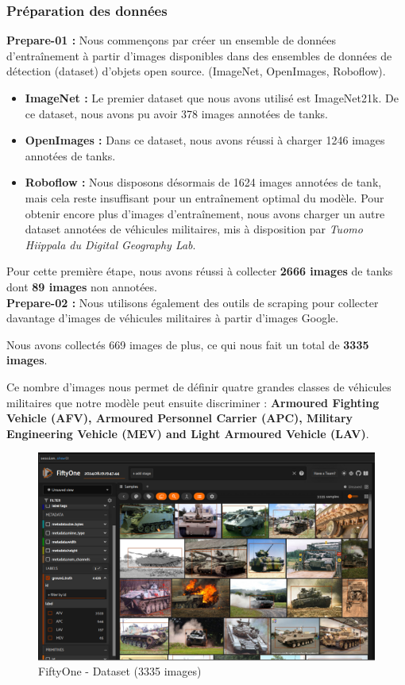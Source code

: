 \subsubsection{Préparation des données}

\indent \textbf{Prepare-01 :} Nous commençons par créer un ensemble de données d'entraînement à partir d'images disponibles dans des ensembles de données de détection (dataset) d'objets open source. (ImageNet, OpenImages, Roboflow).

\begin{itemize}
	\item \textbf{ImageNet : }Le premier dataset que nous avons utilisé est ImageNet21k. De ce dataset, nous avons pu avoir 378 images annotées de tanks.
	\item \textbf{OpenImages : } Dans ce dataset, nous avons réussi à charger 1246 images annotées de tanks.
	\item \textbf{Roboflow : } Nous disposons désormais de 1624 images annotées de tank, mais cela reste insuffisant pour un entraînement optimal du modèle. Pour obtenir encore plus d'images d'entraînement, nous avons charger un autre dataset annotées de véhicules militaires, mis à disposition par \textit{Tuomo Hiippala du Digital Geography Lab}.
\end{itemize}

\noindent Pour cette première étape, nous avons réussi à collecter \textbf{2666 images} de tanks dont \textbf{89 images} non annotées.\\


\noindent\textbf{Prepare-02 :} Nous utilisons également des outils de scraping pour collecter davantage d'images de véhicules militaires à partir d'images Google.

\noindent Nous avons collectés 669 images de plus, ce qui nous fait un total de \textbf{3335 images}.

Ce nombre d'images nous permet de définir quatre grandes classes de véhicules militaires que notre modèle peut ensuite discriminer : \textbf{Armoured Fighting Vehicle (AFV), Armoured Personnel Carrier (APC), Military Engineering Vehicle (MEV) and Light Armoured Vehicle (LAV)}.


\begin{figure}[h]
	\center
	\includegraphics[width=\textwidth]{./images/fiftyone-dataset.png}
	\caption[Fiftyone dataset]{FiftyOne - Dataset (3335 images)}\label{fig:fiftyone-dataset}
\end{figure}

